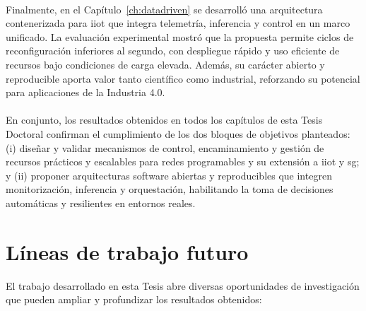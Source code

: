 \\
Finalmente, en el Capítulo~\ref{ch:datadriven} se desarrolló una arquitectura contenerizada para \gls{iiot} que integra telemetría, inferencia y control en un marco unificado. La evaluación experimental mostró que la propuesta permite ciclos de reconfiguración inferiores al segundo, con despliegue rápido y uso eficiente de recursos bajo condiciones de carga elevada. Además, su carácter abierto y reproducible aporta valor tanto científico como industrial, reforzando su potencial para aplicaciones de la Industria 4.0.\\
\\
En conjunto, los resultados obtenidos en todos los capítulos de esta Tesis Doctoral confirman el cumplimiento de los dos bloques de objetivos planteados: (i) diseñar y validar mecanismos de control, encaminamiento y gestión de recursos prácticos y escalables para redes programables y su extensión a \gls{iiot} y \gls{sg}; y (ii) proponer arquitecturas software abiertas y reproducibles que integren monitorización, inferencia y orquestación, habilitando la toma de decisiones automáticas y resilientes en entornos reales.

\section{Líneas de trabajo futuro}

El trabajo desarrollado en esta Tesis abre diversas oportunidades de investigación que pueden ampliar y profundizar los resultados obtenidos:

